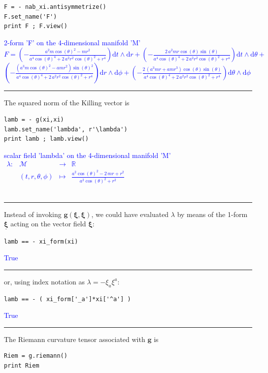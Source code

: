 \documentclass[a4paper]{jpconf}
\newcommand{\w}[1]{\bm{#1}}
\newcommand{\soutput}[1]{\textcolor{blue}{#1}\\[-0.8ex]\rule{\textwidth}{0.4pt}}
\begin{document}
\begin{verbatim}
F = - nab_xi.antisymmetrize()
F.set_name('F')
print F ; F.view()
\end{verbatim}
\soutput{2-form 'F' on the 4-dimensional manifold 'M'\\[1ex]
$F = \left( -\frac{a^{2} m \cos\left(\theta\right)^{2} - m r^{2}}{a^{4}
\cos\left(\theta\right)^{4} + 2 \, a^{2} r^{2}
\cos\left(\theta\right)^{2} + r^{4}} \right) \mathrm{d} t\wedge
\mathrm{d} r + \left( -\frac{2 \, a^{2} m r \cos\left(\theta\right)
\sin\left(\theta\right)}{a^{4} \cos\left(\theta\right)^{4} + 2 \, a^{2}
r^{2} \cos\left(\theta\right)^{2} + r^{4}} \right) \mathrm{d} t\wedge
\mathrm{d} \theta + $\\
$\left( -\frac{{\left(a^{3} m
\cos\left(\theta\right)^{2} - a m r^{2}\right)}
\sin\left(\theta\right)^{2}}{a^{4} \cos\left(\theta\right)^{4} + 2 \,
a^{2} r^{2} \cos\left(\theta\right)^{2} + r^{4}} \right) \mathrm{d}
r\wedge \mathrm{d} \phi + \left( -\frac{2 \, {\left(a^{3} m r + a m
r^{3}\right)} \cos\left(\theta\right) \sin\left(\theta\right)}{a^{4}
\cos\left(\theta\right)^{4} + 2 \, a^{2} r^{2}
\cos\left(\theta\right)^{2} + r^{4}} \right) \mathrm{d} \theta\wedge
\mathrm{d} \phi$}
The squared norm of the Killing vector is
\begin{verbatim}
lamb = - g(xi,xi)
lamb.set_name('lambda', r'\lambda')
print lamb ; lamb.view()
\end{verbatim}
\soutput{scalar field 'lambda' on the 4-dimensional manifold 'M'\\[1ex]
$\begin{array}{llcl} \lambda:& \mathcal{M} & \longrightarrow
& \mathbb{R} \\ & \left(t, r, \theta, \phi\right) & \longmapsto
& \frac{a^{2} \cos\left(\theta\right)^{2} - 2 \, m r + r^{2}}{a^{2}
\cos\left(\theta\right)^{2} + r^{2}} \end{array}$\\[-1ex]}
Instead of invoking $\w{g}(\w{\xi},\w{\xi})$, we could have evaluated $\lambda$ 
by means of the 1-form $\w{\underline{\xi}}$ acting on the vector field $\w{\xi}$:
\begin{verbatim}
lamb == - xi_form(xi)
\end{verbatim}
\soutput{True}
or, using index notation as $\lambda = - \xi_a \xi^a$:
\begin{verbatim}
lamb == - ( xi_form['_a']*xi['^a'] )
\end{verbatim}
\soutput{True}
The Riemann curvature tensor associated with $\w{g}$ is
\begin{verbatim}
Riem = g.riemann()
print Riem
\end{verbatim}
\end{document}
